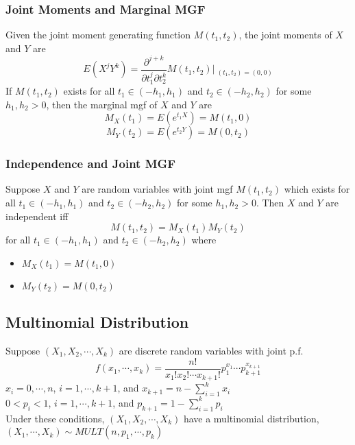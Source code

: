 \documentclass[11pt]{article}
\begin{document}
\subsubsection{Joint Moments and Marginal MGF}
Given the joint moment generating function $M(t_1,t_2)$, the joint moments of $X$ and $Y$ are
\[E(X^jY^k) = \frac{\partial^{j+k}}{\partial t_1^j\partial t_2^k}M(t_1,t_2)|\ _{(t_1,t_2)=(0,0)}\]
If $M(t_1,t_2)$ exists for all $t_1\in(-h_1,h_1)$ and $t_2\in(-h_2,h_2)$ for some $h_1,h_2>0$, then the marginal mgf of $X$ and $Y$ are
\[M_X(t_1)=E(e^{t_1X})=M(t_1,0)\]
\[M_Y(t_2)=E(e^{t_2Y})=M(0,t_2)\]
\subsubsection{Independence and Joint MGF}
Suppose $X$ and $Y$ are random variables with joint mgf $M(t_1,t_2)$ which exists for all $t_1\in(-h_1,h_1)$ and $t_2\in(-h_2,h_2)$ for some $h_1,h_2>0$. Then $X$ and $Y$ are independent iff
\[M(t_1,t_2)=M_X(t_1)M_Y(t_2)\]
for all $t_1\in(-h_1,h_1)$ and $t_2\in(-h_2,h_2)$ where 
\begin{itemize}
    \item $M_X(t_1) = M(t_1,0)$
    \item $M_Y(t_2) = M(0, t_2)$
\end{itemize}
\subsection{Multinomial Distribution}
Suppose $(X_1,X_2,\cdots,X_k)$ are discrete random variables with joint p.f.
\[f(x_1,\cdots,x_k) = \frac{n!}{x_1!x_2!\cdots x_{k+1}!}p_1^{x_1}\cdots p_{k+1}^{x_{k+1}}\]
$x_i=0,\cdots,n$, $i=1,\cdots,k+1$, and $x_{k+1} = n-\sum_{i=1}^{k}x_i$ \\
$0<p_i<1$, $i=1,\cdots,k+1$, and $p_{k+1} = 1 - \sum_{i=1}^{k}p_i$ \\
Under these conditions, $(X_1,X_2,\cdots,X_k)$ have a multinomial distribution, \\
$(X_1,\cdots,X_k)\sim MULT(n,p_1,\cdots,p_k)$ 
\end{document}
